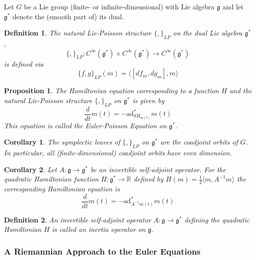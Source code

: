 \documentclass{article}
\newtheorem{defn}{Definition}
\newtheorem{prop}{Proposition}
\newtheorem{cor}{Corollary}
\begin{document}
Let $G$ be a Lie group (finite- or infinite-dimensional) with Lie algebra $ \mathfrak{g}$ and let $ \mathfrak{g}^*$ denote the (smooth part of) its dual.


\begin{defn}

	The natural \textit{Lie-Poisson} structure $ \{ , \}_{LP}$ on the dual Lie algebra $ \mathfrak{g}^*$,
	\[\{ , \}_{LP} : C^{\infty}( \mathfrak{g}^*) \times C^{\infty}( \mathfrak{g}^*) \to C^{\infty}( \mathfrak{g}^*)\]
is defined via
\[
	\{ f,g \}_{LP} (m) = \langle [df_m, dg_m], m \rangle
\]
\end{defn}


\begin{prop}

	The Hamiltonian equation corresponding to a function $H$ and the natural Lie-Poisson structure $ \{ , \}_{LP}$ on $ \mathfrak{g}^*$ is given by 
\[
	\frac{d}{dt}m(t) = - \mathrm{ad}^*_{dH_{m(t)}}m(t)
\]
This equation is called the Euler-Poisson Equation on $ \mathfrak{g}^*$.
\end{prop}


\begin{cor}

	The symplectic leaves of $ \{ , \}_{LP}$ on $ \mathfrak{g}^*$ are the coadjoint orbits of $G$. In particular, all (finite-dimensional) coadjoint orbits have even dimension.

\end{cor}



\begin{cor}

	Let $ A: \mathfrak{g} \to \mathfrak{g}^*$ be an invertible self-adjoint operator. For the quadratic Hamiltonian function $ H: \mathfrak{g}^* \to \mathbb{R}$ defined by $H(m) = \frac{1}{2} \langle m, A^{-1} m \rangle$ the corresponding Hamiltonian equation is 
\[
	\frac{d}{dt} m(t) = - \mathrm{ad}^*_{A^{-1}m(t)} m(t)
\]

\end{cor}




\begin{defn}

An invertible self-adjoint operator $ A: \mathfrak{g} \to \mathfrak{g}^*$ defining the quadratic Hamiltonian $H$ is called an \textit{inertia operator on} $ \mathfrak{g}$.

\end{defn}

\subsubsection{A Riemannian Approach to the Euler Equations}
\end{document}
